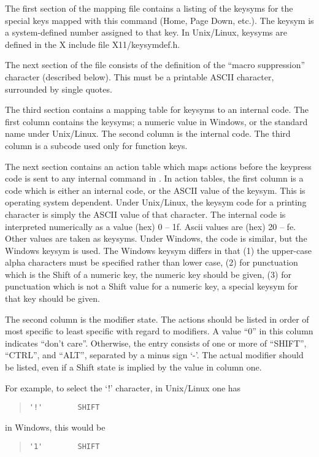 The first section of the mapping file contains a listing of the
keysyms for the special keys mapped with this command ({\kb Home},
{\kb Page Down}, etc.).  The keysym is a system-defined number
assigned to that key.  In Unix/Linux, keysyms are defined in the X
include file {\vt X11/keysymdef.h}.

The next section of the file consists of the definition of the ``macro
suppression'' character (described below).  This must be a printable
ASCII character, surrounded by single quotes.

The third section contains a mapping table for keysyms to an internal
code.  The first column contains the keysyms; a numeric value in
Windows, or the standard name under Unix/Linux.  The second column is
the internal code.  The third column is a subcode used only for
function keys.

The next section contains an action table which maps actions before
the keypress code is sent to any internal command in {\Xic}.  In
action tables, the first column is a code which is either an internal
code, or the ASCII value of the keysym.  This is operating system
dependent.  Under Unix/Linux, the keysym code for a printing character
is simply the ASCII value of that character.  The internal code is
interpreted numerically as a value (hex) 0 -- 1f.  Ascii values are
(hex) 20 -- fe.  Other values are taken as keysyms.  Under Windows, the
code is similar, but the Windows keysym is used.  The Windows keysym
differs in that (1) the upper-case alpha characters must be specified
rather than lower case, (2) for punctuation which is the Shift of a
numeric key, the numeric key should be given, (3) for punctuation
which is not a Shift value for a numeric key, a special keysym for
that key should be given.

The second column is the modifier state.  The actions should be listed
in order of most specific to least specific with regard to modifiers. 
A value ``0'' in this column indicates ``don't care''.  Otherwise, the
entry consists of one or more of ``SHIFT'', ``CTRL'', and ``ALT'',
separated by a minus sign `{\vt -}'.  The actual modifier should be
listed, even if a Shift state is implied by the value in column one.

For example, to select the `!' character, in Unix/Linux one has
\begin{quote}
\begin{verbatim}
'!'        SHIFT
\end{verbatim}
\end{quote}
in Windows, this would be
\begin{quote}
\begin{verbatim}
'1'        SHIFT
\end{verbatim}
\end{quote}

